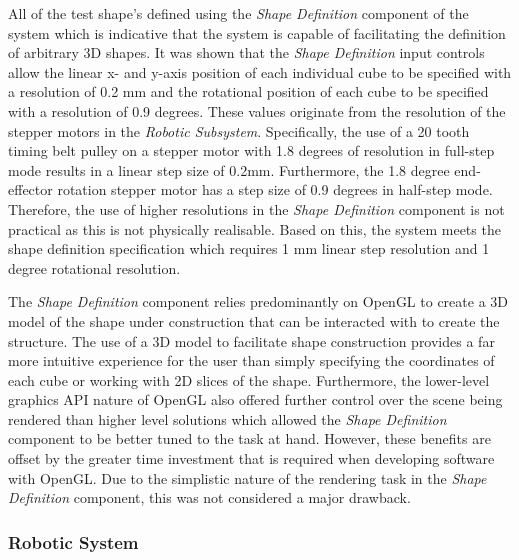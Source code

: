 All of the test shape's defined using the \textit{Shape Definition} component of the system which is indicative that the system is capable of facilitating the definition of arbitrary 3D shapes. It was shown that the \textit{Shape Definition} input controls allow the linear x- and y-axis position of each individual cube to be specified with a resolution of 0.2 mm and the rotational position of each cube to be specified with a resolution of 0.9 degrees. These values originate from the resolution of the stepper motors in the \textit{Robotic Subsystem}. Specifically, the use of a 20 tooth timing belt pulley on a stepper motor with 1.8 degrees of resolution in full-step mode results in a linear step size of 0.2mm. Furthermore, the 1.8 degree end-effector rotation stepper motor has a step size of 0.9 degrees in half-step mode. Therefore, the use of higher resolutions in the \textit{Shape Definition} component is not practical as this is not physically realisable. Based on this, the system meets the shape definition specification which requires 1 mm linear step resolution and 1 degree rotational resolution. 

The \textit{Shape Definition} component relies predominantly on OpenGL to create a 3D model of the shape under construction that can be interacted with to create the structure. The use of a 3D model to facilitate shape construction provides a far more intuitive experience for the user than simply specifying the coordinates of each cube or working with 2D slices of the shape. Furthermore, the lower-level graphics API nature of OpenGL also offered further control over the scene being rendered than higher level solutions which allowed the \textit{Shape Definition} component to be better tuned to the task at hand. However, these benefits are offset by the greater time investment that is required when developing software with OpenGL. Due to the simplistic nature of the rendering task in the \textit{Shape Definition} component, this was not considered a major drawback.

\subsubsection{Robotic System} \label{sec5:Robotic System}


